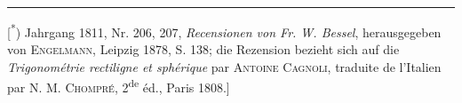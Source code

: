 \par\medskip\noindent\rule{.24\linewidth}{.4pt}\par\smallskip
{\small
\noindent\hspace*{\parindent}[\textsuperscript{*}) Jahrgang 1811, Nr. 206, 207, \textit{Recensionen von Fr. W. Bessel}, herausgegeben von \textsc{Engelmann}, Leipzig 1878, S. 138; die Rezension bezieht sich auf die \textit{Trigonométrie rectiligne et sphérique} par \textsc{Antoine Cagnoli}, traduite de l’Italien par \textsc{N. M. Chompré}, 2\textsuperscript{de} éd., Paris 1808.]
\par}

